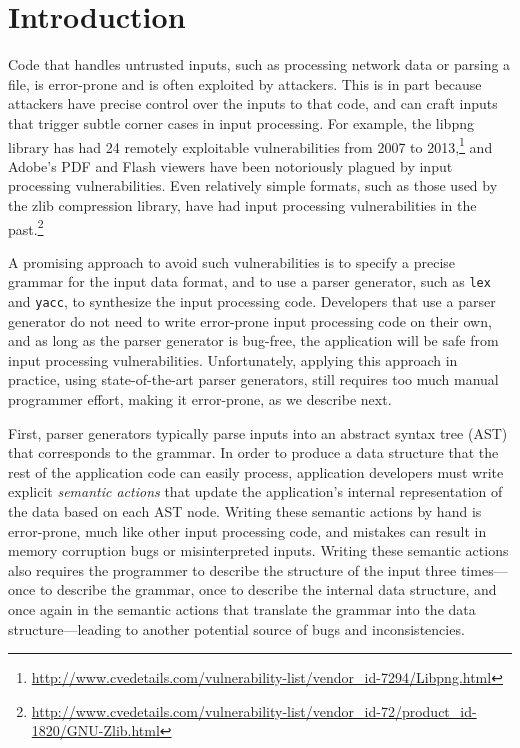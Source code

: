 \section{Introduction}

Code that handles untrusted inputs, such as processing network
data or parsing a file, is error-prone and is often exploited by
attackers.  This is in part because attackers have precise control
over the inputs to that code, and can craft inputs that trigger
subtle corner cases in input processing.  For example, the libpng
library has had 24 remotely exploitable vulnerabilities from 2007 to
2013,\footnote{\url{http://www.cvedetails.com/vulnerability-list/vendor_id-7294/Libpng.html}}
and Adobe's PDF and Flash viewers have been notoriously
plagued by input processing vulnerabilities.  Even relatively
simple formats, such as those used by the zlib compression
library, have had input processing vulnerabilities in the
past.\footnote{\url{http://www.cvedetails.com/vulnerability-list/vendor_id-72/product_id-1820/GNU-Zlib.html}}

A promising approach to avoid such vulnerabilities is to specify
a precise grammar for the input data format, and to use a parser
generator, such as {\tt lex} and {\tt yacc}, to synthesize the input
processing code.  Developers that use a parser generator do not need
to write error-prone input processing code on their own, and as long
as the parser generator is bug-free, the application will be safe from
input processing vulnerabilities.  Unfortunately, applying this approach
in practice, using state-of-the-art parser generators, still requires
too much manual programmer effort, making it error-prone, as we describe
next.

First, parser generators typically parse inputs into an abstract syntax
tree (AST) that corresponds to the grammar.  In order to produce a data
structure that the rest of the application code can easily process,
application developers must write explicit {\em semantic actions} that
update the application's internal representation of the data based on
each AST node.  Writing these semantic actions by hand is error-prone,
much like other input processing code, and mistakes can result in memory
corruption bugs or misinterpreted inputs.  Writing these semantic actions
also requires the programmer to describe the structure of the input three
times---once to describe the grammar, once to describe the internal data
structure, and once again in the semantic actions that translate the
grammar into the data structure---leading to another potential source
of bugs and inconsistencies.

